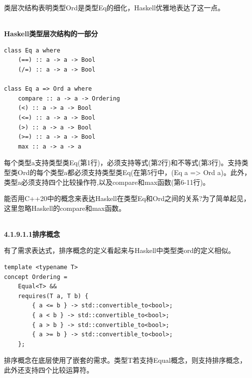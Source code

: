 类层次结构表明类型Ord是类型Eq的细化，Haskell优雅地表达了这一点。

\hspace*{\fill} \\ %
\noindent
\textbf{Haskell类型层次结构的一部分}
\begin{lstlisting}[style=styleCXX]
class Eq a where
	(==) :: a -> a -> Bool
	(/=) :: a -> a -> Bool

class Eq a => Ord a where
	compare :: a -> a -> Ordering
	(<) :: a -> a -> Bool
	(<=) :: a -> a -> Bool
	(>) :: a -> a -> Bool
	(>=) :: a -> a -> Bool
	max :: a -> a -> a
\end{lstlisting}

每个类型a支持类型类Eq(第1行)，必须支持等式(第2行)和不等式(第3行)。支持类型类Ord的每个类型a都必须支持类型类Eq(在第5行中，(Eq a => Ord a)。此外，类型a必须支持四个比较操作符,以及compare和max函数(第6-11行)。

能否用C++20中的概念来表达Haskell在类型Eq和Ord之间的关系?为了简单起见，这里忽略Haskell的compare和max函数。

\hspace*{\fill} \\ %
\noindent
\textbf{4.1.9.1.1\hspace{0.2cm}排序概念}

有了需求表达式，排序概念的定义看起来与Haskell中类型类ord的定义相似。

\begin{lstlisting}[style=styleCXX]
template <typename T>
concept Ordering =
	Equal<T> &&
	requires(T a, T b) {
		{ a <= b } -> std::convertible_to<bool>;
		{ a < b } -> std::convertible_to<bool>;
		{ a > b } -> std::convertible_to<bool>;
		{ a >= b } -> std::convertible_to<bool>;
	};
\end{lstlisting}

排序概念在底层使用了嵌套的需求。类型T若支持Equal概念，则支持排序概念，此外还支持四个比较运算符。

